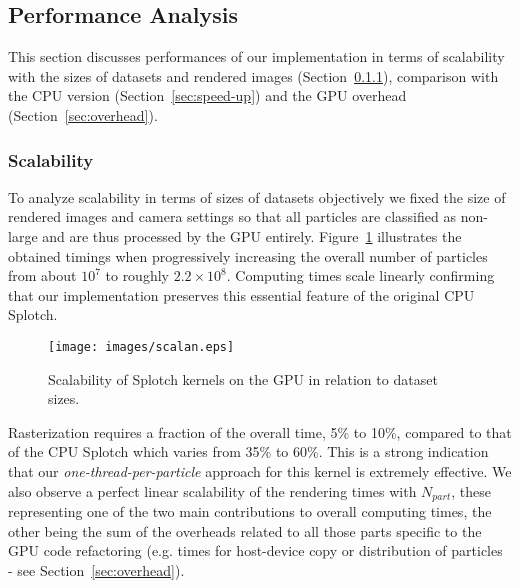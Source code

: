 \documentclass[1p]{elsarticle}
\begin{document}
\subsection{Performance Analysis}
\label{sec:performance}
This section discusses performances of our implementation in terms of scalability with the sizes of datasets and rendered images (Section~\ref{sec:scalability}), comparison with the CPU version (Section~\ref{sec:speed-up}) and the GPU overhead (Section~\ref{sec:overhead}).

\subsubsection{Scalability}
\label{sec:scalability}
To analyze scalability in terms of sizes of datasets objectively we fixed the size of rendered images and camera settings so that all particles are classified as non-large and are thus processed by the GPU entirely. 
Figure~\ref{fig:scalability} illustrates the obtained timings when progressively increasing the overall number of particles
from about $10^7$ to roughly $2.2\times 10^8$. Computing times scale linearly confirming that our implementation preserves this essential feature of the original CPU Splotch. 
\begin{figure}
\centering
\texttt{[image: images/scalan.eps]}
\caption{Scalability of Splotch kernels on the GPU in relation to dataset sizes.}
\label{fig:scalability}
\end{figure}
Rasterization requires a fraction of the overall time, 5\% to 10\%, compared to that of the CPU Splotch which varies from 35\% to 60\%. This is a strong indication that our {\it one-thread-per-particle} approach for this kernel is extremely effective. We also observe a perfect linear scalability of the rendering times with $N_{part}$, these representing one of the two main contributions to overall computing times, the other being the sum of the overheads related to all those parts specific to the GPU code refactoring (e.g. times for host-device copy or distribution of particles - see Section~\ref{sec:overhead}). 
\end{document}
